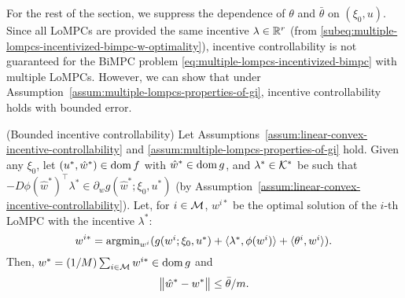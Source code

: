 For the rest of the section, we suppress the dependence of $\theta$ and $\bar{\theta}$ on $(\xi_0, u)$.
Since all LoMPCs are provided the same incentive $\lambda \in \mathbb{R}^r$ (from \eqref{subeq:multiple-lompcs-incentivized-bimpc-w-optimality}), incentive controllability is not guaranteed for the BiMPC problem \eqref{eq:multiple-lompcs-incentivized-bimpc} with multiple LoMPCs.
However, we can show that under Assumption~\ref{assum:multiple-lompcs-properties-of-gi}, incentive controllability holds with bounded error.

\begin{lemma} (Bounded incentive controllability)
\label{lem:bounded-incentive-controllability}
Let Assumptions~\ref{assum:linear-convex-incentive-controllability} and \ref{assum:multiple-lompcs-properties-of-gi} hold.
Given any $\xi_0$, let $(u^*, \hat{w}^*) \in \operatorname{dom} f$ with $\hat{w}^* \in \operatorname{dom} g$,
and $\lambda^* \in \mathcal{K}^*$ be such that $-D\phi(\hat{w}^*)^\top\lambda^* \in \partial_w g(\hat{w}^*; \xi_0, u^*)$ (by Assumption~\ref{assum:linear-convex-incentive-controllability}).
Let, for $i \in \mathcal{M}$, $w^{i*}$ be the optimal solution of the $i$-th LoMPC with the incentive $\lambda^*$:
\begin{equation}
\label{eq:bounded-incentive-controllability-wi}
    \hspace{-5pt} w^{i*} = \textstyle{\operatorname*{argmin}}_{w^i} ( g(w^i; \xi_0, u^*) + \langle \lambda^*, \phi(w^i)\rangle + \langle \theta^i, w^i\rangle ). \hspace{-4pt}
\end{equation}
Then, $w^* = (1/M) \sum_{i \in \mathcal{M}} w^{i*} \in \operatorname{dom}{g}$ and
\begin{equation}
\label{eq:bounded-incentive-controllability-error-bound}
    \bigl\lVert \hat{w}^* - w^* \bigr\rVert \leq \bar{\theta}/m.
\end{equation}
\end{lemma}

